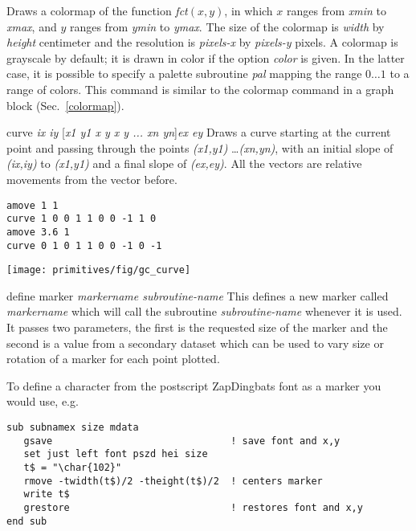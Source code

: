 \begin{commanddescription}
Draws a colormap of the function {\it fct}$(x,y)$, in which $x$ ranges from {\it xmin} to {\it xmax}, and $y$ ranges from {\it ymin} to {\it ymax}. The size of the colormap is {\it width} by {\it height} centimeter and the resolution is {\it pixels-x} by {\it pixels-y} pixels. A colormap is grayscale by default; it is drawn in color if the option {\it color} is given. In the latter case, it is possible to specify a palette subroutine {\it pal} mapping the range $0 \ldots 1$ to a range of colors. This command is similar to the colormap command in a graph block (Sec.~\ref{colormap}).

\item[{\sf curve {\it ix iy }[{\it x1 y1 x y x y ... xn yn}]{\it ex ey }}  ]
 Draws a curve starting at the current point and passing through the points
{\it (x1,y1)} \ldots {\it (xn,yn)}, with an initial slope of {\it (ix,iy)} to
{\it (x1,y1)} and a final slope of {\it (ex,ey)}. All the vectors are
relative movements from the vector before.

\begin{minipage}[c]{8cm}
\begin{Verbatim}
amove 1 1 
curve 1 0 0 1 1 0 0 -1 1 0 
amove 3.6 1 
curve 0 1 0 1 1 0 0 -1 0 -1 
\end{Verbatim}
\end{minipage}
\hfill
\begin{minipage}[c]{7cm}
\mbox{\texttt{[image: primitives/fig/gc\_curve]}}
\end{minipage}

\item[{\sf define marker {\it markername  subroutine-name}}]
This defines a new marker called {\it markername} which will call
the subroutine {\it subroutine-name} whenever it is used.  It
passes two parameters, the first is the requested size of the
marker and the second is a value from a secondary dataset which
can be used to vary size or rotation of a marker for each point plotted.

To define a character from the postscript ZapDingbats font as a marker you
would use, e.g.

\begin{Verbatim}
sub subnamex size mdata
   gsave                               ! save font and x,y
   set just left font pszd hei size
   t$ = "\char{102}"
   rmove -twidth(t$)/2 -theight(t$)/2  ! centers marker
   write t$
   grestore                            ! restores font and x,y
end sub
\end{Verbatim}


\end{commanddescription}
